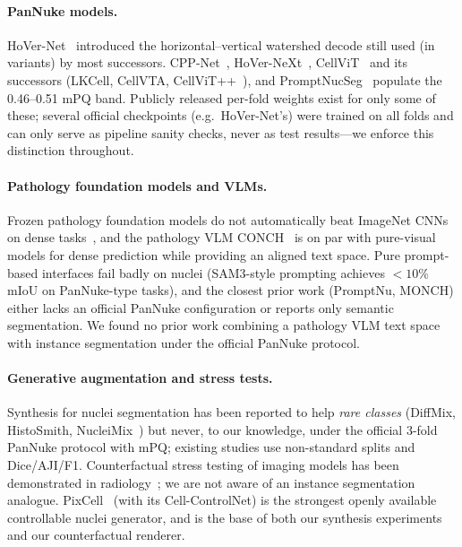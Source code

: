 \documentclass[11pt]{article}
\begin{document}
\paragraph{PanNuke models.} HoVer-Net~\cite{graham2019hovernet} introduced the
horizontal--vertical watershed decode still used (in variants) by most successors.
CPP-Net~\cite{cppnet}, HoVer-NeXt~\cite{hovenext}, CellViT~\cite{horta2024cellvit} and its
successors (LKCell, CellVTA, CellViT++~\cite{horta2025cellvitpp}), and
PromptNucSeg~\cite{promptnucseg} populate the 0.46--0.51 mPQ band. Publicly released per-fold
weights exist for only some of these; several official checkpoints (e.g.\ HoVer-Net's) were
trained on all folds and can only serve as pipeline sanity checks, never as test
results---we enforce this distinction throughout.

\paragraph{Pathology foundation models and VLMs.} Frozen pathology foundation models do not
automatically beat ImageNet CNNs on dense tasks~\cite{mindthegap}, and the pathology VLM
CONCH~\cite{lu2024conch} is on par with pure-visual models for dense prediction while providing
an aligned text space. Pure prompt-based interfaces fail badly on nuclei (SAM3-style prompting
achieves $<10\%$ mIoU on PanNuke-type tasks), and the closest prior work (PromptNu, MONCH)
either lacks an official PanNuke configuration or reports only semantic segmentation. We found
no prior work combining a pathology VLM text space with instance segmentation under the official
PanNuke protocol.

\paragraph{Generative augmentation and stress tests.} Synthesis for nuclei segmentation has
been reported to help \emph{rare classes} (DiffMix, HistoSmith, NucleiMix~\cite{nucleimix})
but never, to our knowledge, under the official 3-fold PanNuke protocol with mPQ; existing
studies use non-standard splits and Dice/AJI/F1. Counterfactual stress testing of imaging
models has been demonstrated in radiology~\cite{cfstress}; we are not aware of an instance
segmentation analogue. PixCell~\cite{le2025pixcell} (with its Cell-ControlNet) is the
strongest openly available controllable nuclei generator, and is the base of both our synthesis
experiments and our counterfactual renderer.
\end{document}
